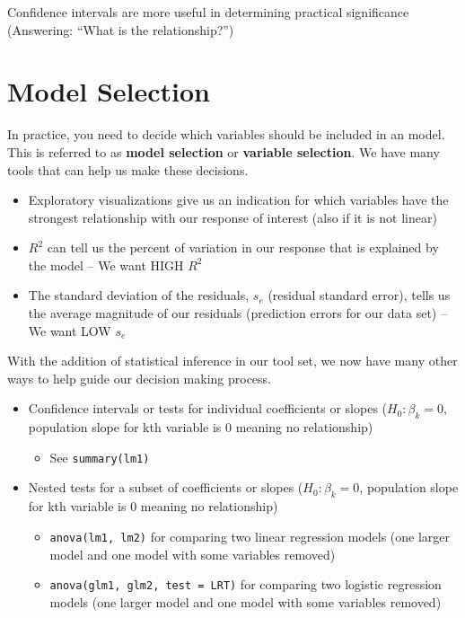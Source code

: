 \documentclass[]{book}
\providecommand{\tightlist}{%
  \setlength{\itemsep}{0pt}\setlength{\parskip}{0pt}}
\begin{document}
Confidence intervals are more useful in determining practical significance (Answering: ``What is the relationship?'')

\hypertarget{model-selection}{%
\section{Model Selection}\label{model-selection}}

In practice, you need to decide which variables should be included in an model. This is referred to as \textbf{model selection} or \textbf{variable selection}. We have many tools that can help us make these decisions.

\begin{itemize}
\tightlist
\item
  Exploratory visualizations give us an indication for which variables have the strongest relationship with our response of interest (also if it is not linear)
\item
  \(R^2\) can tell us the percent of variation in our response that is explained by the model -- We want HIGH \(R^2\)
\item
  The standard deviation of the residuals, \(s_e\) (residual standard error), tells us the average magnitude of our residuals (prediction errors for our data set) -- We want LOW \(s_e\)
\end{itemize}

With the addition of statistical inference in our tool set, we now have many other ways to help guide our decision making process.

\begin{itemize}
\tightlist
\item
  Confidence intervals or tests for individual coefficients or slopes (\(H_0: \beta_k = 0\), population slope for kth variable is 0 meaning no relationship)

  \begin{itemize}
  \tightlist
  \item
    See \texttt{summary(lm1)}
  \end{itemize}
\item
  Nested tests for a subset of coefficients or slopes (\(H_0: \beta_k = 0\), population slope for kth variable is 0 meaning no relationship)

  \begin{itemize}
  \tightlist
  \item
    \texttt{anova(lm1,\ lm2)} for comparing two linear regression models (one larger model and one model with some variables removed)
  \item
    \texttt{anova(glm1,\ glm2,\ test\ =\ \textquotesingle{}LRT\textquotesingle{})} for comparing two logistic regression models (one larger model and one model with some variables removed)
  \end{itemize}
\end{itemize}
\end{document}
